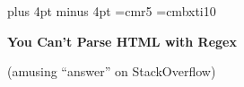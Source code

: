 \parskip 10pt plus 4pt minus 4pt\parindent=0pt%
\lineskiplimit=-1000pt%
\font\lil=cmr5%
\font\bfit=cmbxti10%
\def\rayz#1#2{\llap{\raise #1\hbox{#2}}}%
\def\rayzl#1#2{\llap{\raise #1\hbox{\lil #2}}}%
\def\rayzb#1#2{\llap{\raise #1\hbox{\pmb{#2}}}}%
\def\strike#1{\rlap{\raise 0.7ex\hbox{\vrule height 0.5pt width #1}}}%
\def\graybox#1{\rlap{\special{color push rgb 0.8 0.8 0.8}%
\lower 2pt\hbox{\vrule height 2ex width #1}\special{color pop}}}
\def\pmb#1{\setbox0=\hbox{#1}%
\kern-.01em\copy0\kern-\wd0%
\kern.05em\copy0\kern-\wd0%
\kern-.01em\raise.0333em\box0}%
\centerline{\bf You Can't Parse HTML with Regex}
\centerline{(amusing ``answer'' on StackOverflow)}

\bigskip

